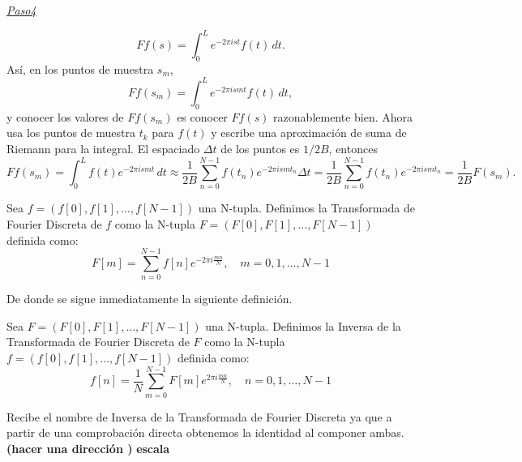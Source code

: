 \underline{\textit{Paso4}}


\[
Ff(s) = \int_{0}^{L} e^{-2\pi ist} f(t) \, dt.
\]
Así, en los puntos de muestra $s_m$,
\[
Ff(s_m) = \int_{0}^{L} e^{-2\pi ism t} f(t) \, dt,
\]
y conocer los valores de $Ff(s_m)$ es conocer $Ff(s)$ razonablemente bien. Ahora usa los puntos de muestra $t_k$ para $f(t)$ y escribe una aproximación de suma de Riemann para la integral. El espaciado $\Delta t$ de los puntos es $1/2B$, entonces
\[
Ff(s_m) = \int_{0}^{L} f(t)e^{-2\pi ism t} \, dt \approx \frac{1}{2B} \sum_{n=0}^{N-1} f(t_n) e^{-2\pi ism t_n} \Delta t = \frac{1}{2B} \sum_{n=0}^{N-1} f(t_n) e^{-2\pi ism t_n} = \frac{1}{2B} F(s_m).
\]


















\vspace{1.5cm}

\begin{definicion}   
Sea $f = (f[0],f[1],\ldots,f[N-1])$ una N-tupla. Definimos la Transformada de Fourier Discreta de $f$ como la N-tupla $F = (F[0],F[1],\ldots,F[N-1])$ definida como:
\begin{equation}
    F[m] = \sum_{n=0}^{N-1} f[n] e^{-2\pi i \frac{mn}{N}}, \quad m = 0,1,\ldots,N-1
\end{equation}
\end{definicion}


\noindent De donde se sigue inmediatamente la siguiente definición.

\begin{definicion}   
Sea $F = (F[0],F[1],\ldots,F[N-1])$ una N-tupla. Definimos la Inversa de la Transformada de Fourier Discreta de $F$ como la N-tupla $f = (f[0],f[1],\ldots,f[N-1])$ definida como:
\begin{equation}
    f[n] = \frac{1}{N}\sum_{m=0}^{N-1} F[m] e^{2\pi i \frac{mn}{N}}, \quad n = 0,1,\ldots,N-1
\end{equation}
\end{definicion}

\noindent Recibe el nombre de Inversa de la Transformada de Fourier Discreta ya que a partir de una comprobación directa obtenemos la identidad al componer ambas. \textbf{(hacer una dirección )}
\textbf{escala}


























\endinput
